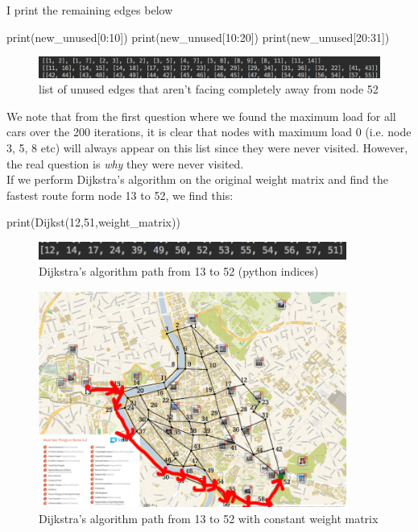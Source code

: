 \documentclass[paper=a4, fontsize=12pt]{scrartcl} %
\numberwithin{equation}{section}       %
\numberwithin{figure}{section}         %
\numberwithin{table}{section}          %
\begin{document}
\begin{enumerate}
I print the remaining edges below

\begin{python}
    print(new_unused[0:10])
    print(new_unused[10:20])
    print(new_unused[20:31])
\end{python}

\begin{figure}[h]
\caption{list of unused edges that aren't facing completely away from node 52}
\centering
\includegraphics[width=1.1\textwidth]{new_unused2}
\end{figure}



We note that from the first question where we found the maximum load for all cars over the 200 iterations, it is clear that nodes with maximum load 0 (i.e. node 3, 5, 8 etc) will always appear on this list since they were never visited. However, the real question is \textit{why} they were never visited. \\

If we perform Dijkstra's algorithm on the original weight matrix and find the fastest route form node 13 to 52, we find this:

\begin{python}
print(Dijkst(12,51,weight_matrix))
\end{python}

\begin{figure}[h]
\caption{Dijkstra's algorithm path from 13 to 52 (python indices)}
\centering
\includegraphics[width=0.9\textwidth]{normalpath}
\end{figure}

\begin{figure}[h]
\caption{Dijkstra's algorithm path from 13 to 52 with constant weight matrix}
\centering
\includegraphics[width=0.9\textwidth]{dijkpath}
\end{figure}




\end{enumerate}
\end{document}
